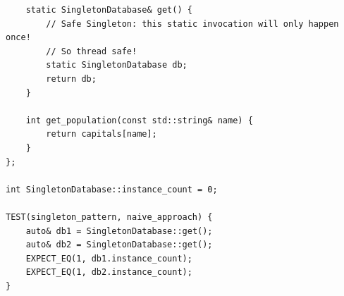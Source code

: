 \documentclass[11pt]{article}
\begin{document}
\begin{itemize}
\begin{multicols}{2}
\begin{lstlisting}
    static SingletonDatabase& get() {
        // Safe Singleton: this static invocation will only happen once!
        // So thread safe!
        static SingletonDatabase db;
        return db;
    }

    int get_population(const std::string& name) {
        return capitals[name];
    }
};

int SingletonDatabase::instance_count = 0;

TEST(singleton_pattern, naive_approach) {
    auto& db1 = SingletonDatabase::get();
    auto& db2 = SingletonDatabase::get();
    EXPECT_EQ(1, db1.instance_count);
    EXPECT_EQ(1, db2.instance_count);
}
            \end{lstlisting}
        \end{multicols}
    \end{itemize}
\end{document}
